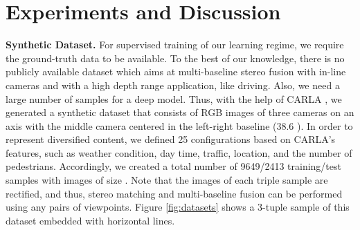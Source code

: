 \documentclass[10pt,twocolumn,letterpaper]{article}
\begin{document}
\section{Experiments and Discussion}
\label{ExperimentalResults}
\noindent\textbf{Synthetic Dataset.} For supervised training of our learning regime, we require the ground-truth data to be available. To the best of our knowledge, there is no publicly available dataset which aims at multi-baseline stereo fusion with in-line cameras and with a high depth range application, like driving. Also, we need a large number of samples for a deep model. Thus, with the help of CARLA \cite{dosovitskiy2017carla}, we generated a synthetic dataset that consists of RGB images of three cameras on an axis with the middle camera centered in the left-right baseline (38.6 ). In order to represent diversified content, we defined 25 configurations based on CARLA's features, such as weather condition, day time, traffic, location, and the number of pedestrians. Accordingly, we created a total number of 9649/2413 training/test samples with images of size . Note that the images of each triple sample are rectified, and thus, stereo matching and multi-baseline fusion can be performed using any pairs of viewpoints. Figure \ref{fig:datasets} shows a 3-tuple sample of this dataset embedded with horizontal lines.
\end{document}
